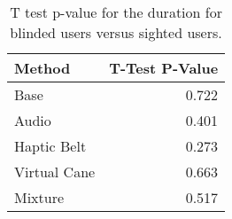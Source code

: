 
\begin{table}[!htb]
\centering
\caption{T test p-value for the duration for blinded users versus sighted users.}
\label{tab:ttest_duration}
\begin{tabular}{lr}
\toprule
      Method &  T-Test P-Value \\
\midrule
        Base &           0.722 \\
       Audio &           0.401 \\
 Haptic Belt &           0.273 \\
Virtual Cane &           0.663 \\
     Mixture &           0.517 \\
\bottomrule
\end{tabular}
\end{table}

